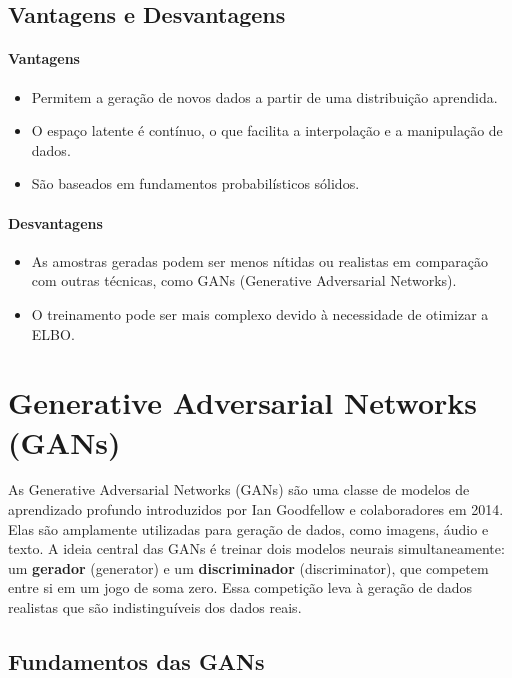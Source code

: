 \documentclass[a4paper]{tufte-handout}
\begin{document}
\subsection{Vantagens e Desvantagens}

\paragraph{Vantagens}
\begin{itemize}
    \item Permitem a geração de novos dados a partir de uma distribuição aprendida.
    \item O espaço latente é contínuo, o que facilita a interpolação e a manipulação de dados.
    \item São baseados em fundamentos probabilísticos sólidos.
\end{itemize}


\paragraph{Desvantagens}
\begin{itemize}
    \item As amostras geradas podem ser menos nítidas ou realistas em comparação com outras técnicas, como GANs (Generative Adversarial Networks).
    \item O treinamento pode ser mais complexo devido à necessidade de otimizar a ELBO.

\end{itemize}

\section{Generative Adversarial Networks (GANs)}

As Generative Adversarial Networks (GANs) são uma classe de modelos de aprendizado profundo introduzidos por Ian Goodfellow e colaboradores em 2014. Elas são amplamente utilizadas para geração de dados, como imagens, áudio e texto. A ideia central das GANs é treinar dois modelos neurais simultaneamente: um \textbf{gerador} (generator) e um \textbf{discriminador} (discriminator), que competem entre si em um jogo de soma zero. Essa competição leva à geração de dados realistas que são indistinguíveis dos dados reais.

\subsection{Fundamentos das GANs}
\end{document}
